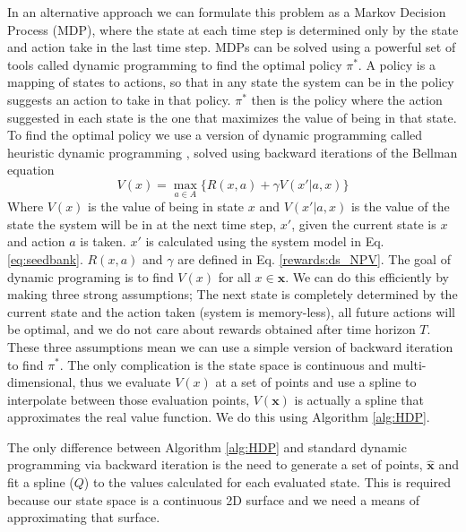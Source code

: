 \documentclass[12pt, a4paper]{article}
\begin{document}
In an alternative approach we can formulate this problem as a Markov Decision Process (MDP), where the state at each time step is determined only by the state and action take in the last time step. MDPs can be solved using a powerful set of tools called dynamic programming to find the optimal policy $\pi^*$. A policy is a mapping of states to actions, so that in any state the system can be in the policy suggests an action to take in that policy. $\pi^*$ then is the policy where the action suggested in each state is the one that maximizes the value of being in that state. To find the optimal policy we use a version of dynamic programming called heuristic dynamic programming \citep{Werb1992}, solved using backward iterations of the Bellman equation 
\begin{equation}\label{eq:bellman}
	V(x) = \max\limits_{a \in A}\lbrace R(x, a) + \gamma V(x'|a, x) \rbrace 
\end{equation}                  
Where $V(x)$ is the value of being in state $x$ and $V(x'|a, x)$ is the value of the state the system will be in at the next time step, $x'$, given the current state is $x$ and action $a$ is taken. $x'$ is calculated using the system model in Eq. \ref{eq:seedbank}. $R(x, a)$ and $\gamma$ are defined in Eq. \ref{rewards:ds_NPV}. The goal of dynamic programing is to find $V(x)$ for all $x \in \mathbf{x}$. We can do this efficiently by making three strong assumptions; The next state is completely determined by the current state and the action taken (system is memory-less), all future actions will be optimal, and we do not care about rewards obtained after time horizon $T$. These three assumptions mean we can use a simple version of backward iteration to find $\pi^*$. The only complication is the state space is continuous and multi-dimensional, thus we evaluate $V(x)$ at a set of points and use a spline to interpolate between those evaluation points, $V(\mathbf{x})$ is actually a spline that approximates the real value function. We do this using Algorithm \ref{alg:HDP}.

The only difference between Algorithm \ref{alg:HDP} and standard dynamic programming via backward iteration is the need to generate a set of points, $\hat{\mathbf{x}}$ and fit a spline ($Q$) to the values calculated for each evaluated state. This is required because our state space is a continuous 2D surface and we need a means of approximating that surface.
\end{document}
